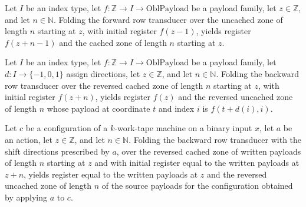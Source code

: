 \begin{lemma}
\label{Complexity.payloadForward_zone}
\leanok
{}
Let $I$ be an index type, let $f:\mathbb Z\to I\to\mathrm{OblPayload}$ be a payload
family, let $z\in\mathbb Z$, and let $n\in\mathbb N$. Folding the forward row transducer
over the uncached zone of length $n$ starting at $z$, with initial register $f(z-1)$,
yields register $f(z+n-1)$ and the cached zone of length $n$ starting at $z$.
\end{lemma}

\begin{lemma}
\label{Complexity.payloadBackward_zone}
\leanok
{}
Let $I$ be an index type, let $f:\mathbb Z\to I\to\mathrm{OblPayload}$ be a payload
family, let $d:I\to\{-1,0,1\}$ assign directions, let $z\in\mathbb Z$, and let
$n\in\mathbb N$. Folding the backward row transducer over the reversed cached zone of
length $n$ starting at $z$, with initial register $f(z+n)$, yields register $f(z)$ and
the reversed uncached zone of length $n$ whose payload at coordinate $t$ and index $i$
is $f(t+d(i),i)$.
\end{lemma}

\begin{lemma}
\label{Complexity.payload_sweeps_source}
\leanok
{}
Let $c$ be a configuration of a $k$-work-tape machine on a binary input $x$, let $a$ be
an action, let $z\in\mathbb Z$, and let $n\in\mathbb N$. Folding the backward row
transducer with the shift directions prescribed by $a$, over the reversed cached zone of
written payloads of length $n$ starting at $z$ and with initial register equal to the
written payloads at $z+n$, yields register equal to the written payloads at $z$ and the
reversed uncached zone of length $n$ of the source payloads for the configuration
obtained by applying $a$ to $c$.
\end{lemma}

